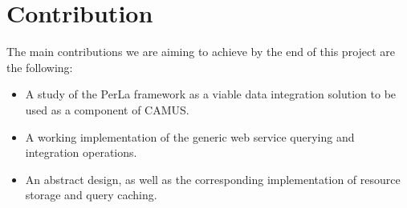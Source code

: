 \section{Contribution}
The main contributions we are aiming to achieve by the end of this project are the following:
\begin{itemize}
\item A study of the PerLa framework as a viable data integration solution to be used as a component of CAMUS.
\item A working implementation of the generic web service querying and integration operations.
\item An abstract design, as well as the corresponding implementation of resource storage and query caching.
\end{itemize}
